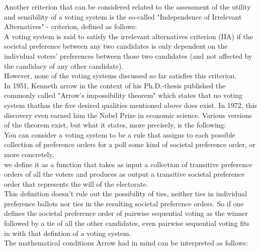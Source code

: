 Another criterion that can be considered related to the assessment of the utility and sensibility of a voting system is the so-called "Independence of Irrelevant Alternatives" - criterion, defined as follows: \\
A voting system is said to satisfy the irrelevant alternatives criterion (IIA) if the societal preference between any two candidates is only dependent on the individual voters' preferences between those two candidates (and not affected by the candidacy of any other candidate). \\
However, none of the voting systems discussed so far satisfies this criterion. \\
In 1951, Kenneth arrow in the context of his Ph.D.-thesis published the commonly called "Arrow's impossibility theorem" which states that no voting system thathas the five desired qualities mentioned above does exist. In 1972, this discovery even earned him the Nobel Prize in economic science. Various versions of the theorem exist, but what it states, more precisely, is the following: \\
You can consider a voting system to be a rule that assigns to each possible collection of preference orders for a poll some kind of societal preference order, or more concretely, \\
we define it as a function that takes as input a collection of transitive preference orders of all the voters and produces as output a transitive societal preference order that represents the will of the electorate. \\
This definition doesn't rule out the possibility of ties, neither ties in individual preference ballots nor ties in the resulting societal preference orders. So if one defines the societal preference order of pairwise sequential voting as the winner followed by a tie of all the other candidates, even pairwise sequential voting fits in with that defintion of a voting system. \\
The mathematical conditions Arrow had in mind can be interpreted as follows: 
